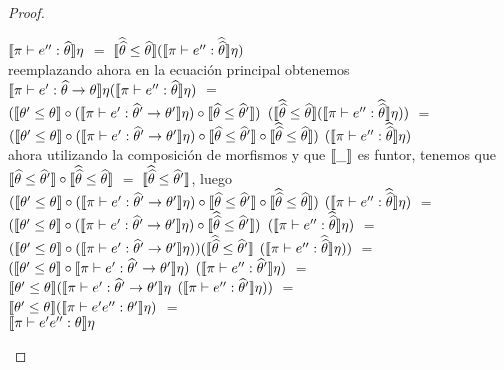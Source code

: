 \begin{proof}
\begin{itemize}
\begin{itemize}
$\llbracket \pi \vdash e'' : \widehat{\theta} \rrbracket\eta$ $=$ 
$\llbracket \widehat{\widehat{\theta}} \leq \widehat{\theta} \rrbracket 
	(\llbracket \pi \vdash e'' : \widehat{\widehat{\theta}} \rrbracket\eta)$\\

reemplazando ahora en la ecuaci\'on principal obtenemos\\

$\llbracket \pi \vdash e' : \widehat{\theta} \rightarrow \theta \rrbracket\eta
							(\llbracket \pi \vdash e'' : \widehat{\theta} \rrbracket\eta)$ $=$\\
$(\llbracket \theta' \leq \theta \rrbracket 
	\circ 
(\llbracket \pi \vdash e' : \widehat{\theta}' \rightarrow \theta' \rrbracket\eta)
	\circ
 \llbracket \widehat{\theta} \leq \widehat{\theta}' \rrbracket)$
$(\llbracket \widehat{\widehat{\theta}} \leq \widehat{\theta} \rrbracket 
	(\llbracket \pi \vdash e'' : \widehat{\widehat{\theta}} \rrbracket\eta))$ $=$\\
$(\llbracket \theta' \leq \theta \rrbracket 
	\circ 
(\llbracket \pi \vdash e' : \widehat{\theta}' \rightarrow \theta' \rrbracket\eta)
	\circ
 \llbracket \widehat{\theta} \leq \widehat{\theta}' \rrbracket
 	\circ
\llbracket \widehat{\widehat{\theta}} \leq \widehat{\theta} \rrbracket )$
$(\llbracket \pi \vdash e'' : \widehat{\widehat{\theta}} \rrbracket\eta)$\\

ahora utilizando la composici\'on de morfismos y que $\llbracket  \_  \rrbracket$ es
funtor, tenemos que 
$\llbracket \widehat{\theta} \leq \widehat{\theta}' \rrbracket
 	\circ
\llbracket \widehat{\widehat{\theta}} \leq \widehat{\theta} \rrbracket$ $=$
$\llbracket \widehat{\widehat{\theta}} \leq \widehat{\theta}' \rrbracket$, luego\\

$(\llbracket \theta' \leq \theta \rrbracket 
	\circ 
(\llbracket \pi \vdash e' : \widehat{\theta}' \rightarrow \theta' \rrbracket\eta)
	\circ
 \llbracket \widehat{\theta} \leq \widehat{\theta}' \rrbracket
 	\circ
\llbracket \widehat{\widehat{\theta}} \leq \widehat{\theta} \rrbracket )$
$(\llbracket \pi \vdash e'' : \widehat{\widehat{\theta}} \rrbracket\eta)$ $=$\\
$(\llbracket \theta' \leq \theta \rrbracket 
	\circ 
(\llbracket \pi \vdash e' : \widehat{\theta}' \rightarrow \theta' \rrbracket\eta)
	\circ
 \llbracket \widehat{\widehat{\theta}} \leq \widehat{\theta}' \rrbracket)$
$(\llbracket \pi \vdash e'' : \widehat{\widehat{\theta}} \rrbracket\eta)$ $=$\\
$(\llbracket \theta' \leq \theta \rrbracket 
	\circ 
(\llbracket \pi \vdash e' : \widehat{\theta}' \rightarrow \theta' \rrbracket\eta))
( \llbracket \widehat{\widehat{\theta}} \leq \widehat{\theta}' \rrbracket$
$(\llbracket \pi \vdash e'' : \widehat{\widehat{\theta}} \rrbracket\eta))$ $=$\\
$(\llbracket \theta' \leq \theta \rrbracket 
	\circ 
\llbracket \pi \vdash e' : \widehat{\theta}' \rightarrow \theta' \rrbracket\eta)$ 
$(\llbracket \pi \vdash e'' : \widehat{\theta}' \rrbracket\eta)$ $=$\\
$\llbracket \theta' \leq \theta \rrbracket 
(\llbracket \pi \vdash e' : \widehat{\theta}' \rightarrow \theta' \rrbracket\eta$
$(\llbracket \pi \vdash e'' : \widehat{\theta}' \rrbracket\eta))$ $=$\\
$\llbracket \theta' \leq \theta \rrbracket(\llbracket \pi \vdash e'e'' : \theta' \rrbracket\eta)$ $=$\\
$\llbracket \pi \vdash e'e'' : \theta \rrbracket\eta$


\end{itemize}
\end{itemize}
\end{proof}
